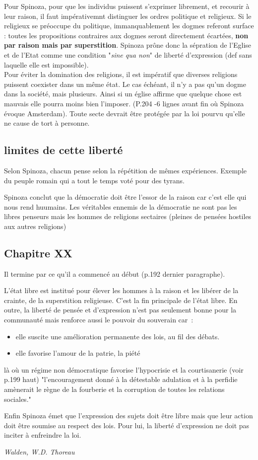 \documentclass[a4paper,12pt]{article}
\begin{document}
Pour Spinoza, pour que les individus puissent s'exprimer librement, et recourir à leur raison, il faut impérativemnt distinguer les ordres politique et religieux. Si le religieux se préoccupe du politique, immanquablement les dogmes referont surface : toutes les propositions contraires aux dogmes seront directement écartées, \textbf{non par raison mais par superstition}. Spinoza prône donc la sépration de l'Eglise et de l'Etat comme une condition "\textit{sine qua non}" de liberté d'expression (def sans laquelle elle est impossible).\\

Pour éviter la domination des religions, il est impératif que diverses religions puissent coexister dans un même état. Le cas échéant, il n'y a pas qu'un dogme dans la société, mais plusieurs. Ainsi si un église affirme que quelque chose est mauvais elle pourra moins bien l'imposer. (P.204 -6 lignes avant fin où Spinoza évoque Amsterdam). Toute secte devrait être protégée par la loi pourvu qu'elle ne cause de tort à personne.

\subsection{limites de cette liberté}

Selon Spinoza, chacun pense selon la répétition de mêmes expériences. Exemple du peuple romain qui a tout le temps voté pour des tyrans.

Spinoza conclut que la démocratie doit être l'essor de la raison car c'est elle qui nous rend huumains. Les véritables ennemis de la démocratie ne sont pas les libres penseurs mais les hommes de religions sectaires (pleines de pensées hostiles aux autres religions)

\subsection{Chapitre XX}

Il termine par ce qu'il a commencé au début (p.192 dernier paragraphe).

L'état libre est institué pour élever les hommes à la raison et les libérer de la crainte, de la superstition religieuse. C'est la fin principale de l'état libre. En outre, la liberté de pensée et d'expression n'est pas seulement bonne pour la communauté mais renforce aussi le pouvoir du souverain car~:
\begin{itemize}
    \item elle suscite une amélioration permanente des lois, au fil des débats.
    \item elle favorise l'amour de la patrie, la piété
\end{itemize}
là où un régime non démocratique favorise l'hypocrisie et la courtisanerie (voir p.199 haut) "l'encouragement donné à la détestable adulation et à la perfidie amènerait le règne de la fourberie et la corruption de toutes les relations sociales."

Enfin Spinoza émet que l'expression des sujets doit être libre mais que leur action doit être soumise au respect des lois. Pour lui, la liberté d'expression ne doit pas inciter à enfreindre la loi.

\textit{Walden, W.D. Thoreau} 
\end{document}
